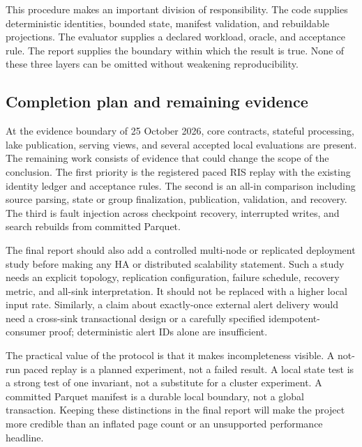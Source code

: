 \documentclass[a4paper,11pt]{article}
\begin{document}
This procedure makes an important division of responsibility. The code supplies deterministic identities, bounded state, manifest validation, and rebuildable projections. The evaluator supplies a declared workload, oracle, and acceptance rule. The report supplies the boundary within which the result is true. None of these three layers can be omitted without weakening reproducibility.

\subsection{Completion plan and remaining evidence}

At the evidence boundary of 25 October 2026, core contracts, stateful processing, lake publication, serving views, and several accepted local evaluations are present. The remaining work consists of evidence that could change the scope of the conclusion. The first priority is the registered paced RIS replay with the existing identity ledger and acceptance rules. The second is an all-in comparison including source parsing, state or group finalization, publication, validation, and recovery. The third is fault injection across checkpoint recovery, interrupted writes, and search rebuilds from committed Parquet.

The final report should also add a controlled multi-node or replicated deployment study before making any HA or distributed scalability statement. Such a study needs an explicit topology, replication configuration, failure schedule, recovery metric, and all-sink interpretation. It should not be replaced with a higher local input rate. Similarly, a claim about exactly-once external alert delivery would need a cross-sink transactional design or a carefully specified idempotent-consumer proof; deterministic alert IDs alone are insufficient.

The practical value of the protocol is that it makes incompleteness visible. A not-run paced replay is a planned experiment, not a failed result. A local state test is a strong test of one invariant, not a substitute for a cluster experiment. A committed Parquet manifest is a durable local boundary, not a global transaction. Keeping these distinctions in the final report will make the project more credible than an inflated page count or an unsupported performance headline.

\end{document}
